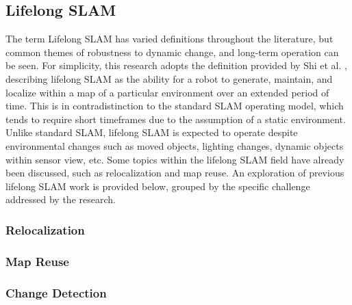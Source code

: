 \subsection{Lifelong SLAM}

The term Lifelong SLAM has varied definitions throughout the literature, but common themes of robustness to dynamic change, and long-term operation can be seen. For simplicity, this research adopts the definition provided by Shi et al. \cite{shiAreWeReady2020}, describing lifelong SLAM as the ability for a robot to generate, maintain, and localize within a map of a particular environment over an extended period of time. This is in contradistinction to the standard SLAM operating model, which tends to require short timeframes due to the assumption of a static environment. Unlike standard SLAM, lifelong SLAM is expected to operate despite environmental changes such as moved objects, lighting changes, dynamic objects within sensor view, etc. Some topics within the lifelong SLAM field have already been discussed, such as relocalization and map reuse. An exploration of previous lifelong SLAM work is provided below, grouped by the specific challenge addressed by the research.

\subsubsection{Relocalization}
\subsubsection{Map Reuse}
\subsubsection{Change Detection}
